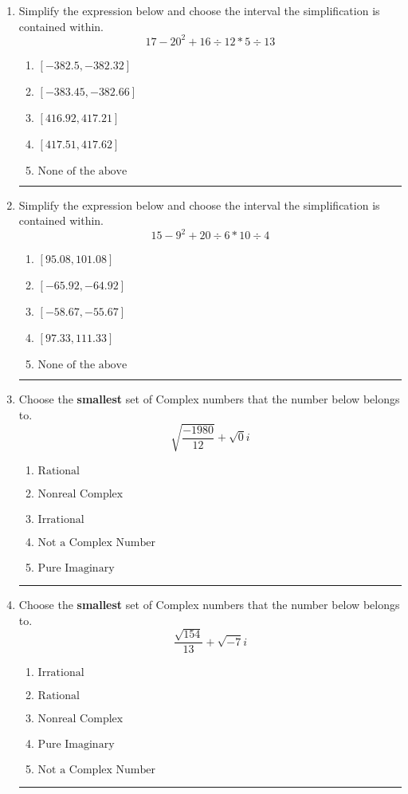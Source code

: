 \documentclass[14pt]{extbook}
\newcommand{\litem}[1]{\item#1\hspace*{-1cm}\rule{\textwidth}{0.4pt}}
\begin{document}
\begin{enumerate}
{\begin{enumerate}[label=\Alph*.]
\end{enumerate} }
\litem{
Simplify the expression below and choose the interval the simplification is contained within.\[ 17 - 20^2 + 16 \div 12 * 5 \div 13 \]\begin{enumerate}[label=\Alph*.]
\item \( [-382.5, -382.32] \)
\item \( [-383.45, -382.66] \)
\item \( [416.92, 417.21] \)
\item \( [417.51, 417.62] \)
\item \( \text{None of the above} \)

\end{enumerate} }
\litem{
Simplify the expression below and choose the interval the simplification is contained within.\[ 15 - 9^2 + 20 \div 6 * 10 \div 4 \]\begin{enumerate}[label=\Alph*.]
\item \( [95.08, 101.08] \)
\item \( [-65.92, -64.92] \)
\item \( [-58.67, -55.67] \)
\item \( [97.33, 111.33] \)
\item \( \text{None of the above} \)

\end{enumerate} }
\litem{
Choose the \textbf{smallest} set of Complex numbers that the number below belongs to.\[ \sqrt{\frac{-1980}{12}}+\sqrt{0}i \]\begin{enumerate}[label=\Alph*.]
\item \( \text{Rational} \)
\item \( \text{Nonreal Complex} \)
\item \( \text{Irrational} \)
\item \( \text{Not a Complex Number} \)
\item \( \text{Pure Imaginary} \)

\end{enumerate} }
\litem{
Choose the \textbf{smallest} set of Complex numbers that the number below belongs to.\[ \frac{\sqrt{154}}{13}+\sqrt{-7}i \]\begin{enumerate}[label=\Alph*.]
\item \( \text{Irrational} \)
\item \( \text{Rational} \)
\item \( \text{Nonreal Complex} \)
\item \( \text{Pure Imaginary} \)
\item \( \text{Not a Complex Number} \)


\end{enumerate}}
\end{enumerate}
\end{document}
